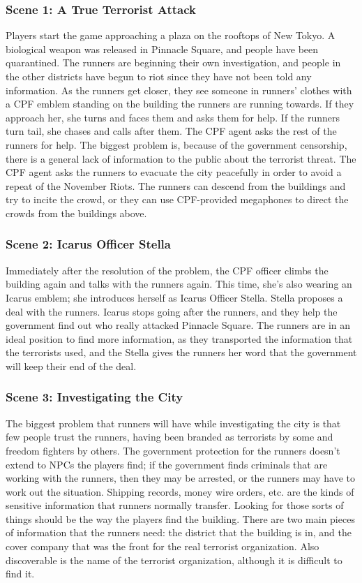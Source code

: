 \documentclass{article}
\begin{document}
\subsubsection{Scene 1: A True Terrorist Attack}
Players start the game approaching a plaza on the rooftops of New Tokyo. A biological weapon was released in Pinnacle Square, and people have been quarantined. The runners are beginning their own investigation, and people in the other districts have begun to riot since they have not been told any information.
As the runners get closer, they see someone in runners’ clothes with a CPF emblem standing on the building the runners are running towards. If they approach her, she turns and faces them and asks them for help. If the runners turn tail, she chases and calls after them.
The CPF agent asks the rest of the runners for help. The biggest problem is, because of the government censorship, there is a general lack of information to the public about the terrorist threat. The CPF agent asks the runners to evacuate the city peacefully in order to avoid a repeat of the November Riots.
The runners can descend from the buildings and try to incite the crowd, or they can use CPF-provided megaphones to direct the crowds from the buildings above.
\subsubsection{Scene 2: Icarus Officer Stella}
Immediately after the resolution of the problem, the CPF officer climbs the building again and talks with the runners again. This time, she’s also wearing an Icarus emblem; she introduces herself as Icarus Officer Stella.
Stella proposes a deal with the runners. Icarus stops going after the runners, and they help the government find out who really attacked Pinnacle Square. The runners are in an ideal position to find more information, as they transported the information that the terrorists used, and the Stella gives the runners her word that the government will keep their end of the deal.
\subsubsection{Scene 3: Investigating the City}
The biggest problem that runners will have while investigating the city is that few people trust the runners, having been branded as terrorists by some and freedom fighters by others. The government protection for the runners doesn’t extend to NPCs the players find; if the government finds criminals that are working with the runners, then they may be arrested, or the runners may have to work out the situation.
Shipping records, money wire orders, etc. are the kinds of sensitive information that runners normally transfer. Looking for those sorts of things should be the way the players find the building. There are two main pieces of information that the runners need: the district that the building is in, and the cover company that was the front for the real terrorist organization. Also discoverable is the name of the terrorist organization, although it is difficult to find it.
\end{document}
